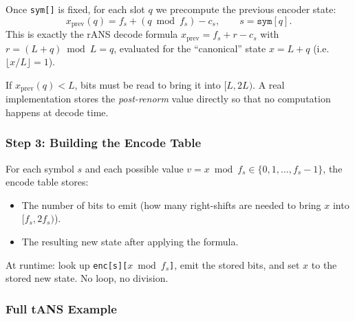 Once \texttt{sym[]} is fixed, for each slot $q$ we
precompute the previous encoder state:
\[
  x_{\text{prev}}(q)
  = f_s + (q \bmod f_s) - c_s,
  \qquad s = \texttt{sym}[q].
\]
This is exactly the rANS decode formula
$x_{\text{prev}} = f_s + r - c_s$ with $r = (L+q) \bmod L = q$,
evaluated for the ``canonical'' state $x = L + q$
(i.e.\ $\lfloor x/L\rfloor = 1$).

If $x_{\text{prev}}(q) < L$, bits must be read to bring it
into $[L, 2L)$.  A real implementation stores the
\emph{post-renorm} value directly so that no computation
happens at decode time.

\subsubsection{Step 3: Building the Encode Table}

For each symbol $s$ and each possible value $v = x \bmod f_s
\in \{0, 1, \ldots, f_s-1\}$, the encode table stores:
\begin{itemize}
  \item The number of bits to emit (how many right-shifts
        are needed to bring $x$ into $[f_s, 2f_s)$).
  \item The resulting new state after applying the formula.
\end{itemize}
At runtime: look up \texttt{enc[s][$x \bmod f_s$]}, emit
the stored bits, and set $x$ to the stored new state.
No loop, no division.

\subsubsection{Full tANS Example}

